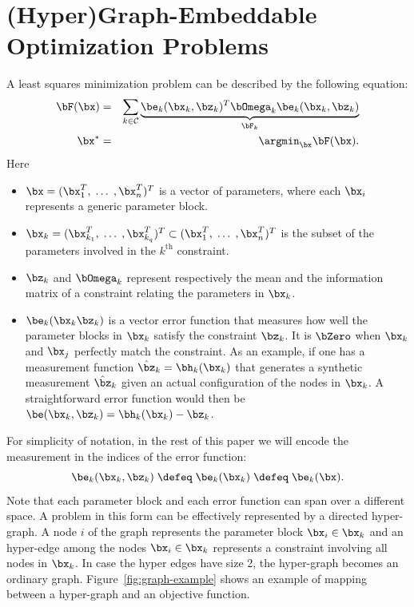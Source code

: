 \documentclass[a4paper]{article}
\begin{document}
\section{(Hyper)Graph-Embeddable Optimization Problems}
A least squares minimization problem can be described by the following equation:
\begin{eqnarray}
\bF(\bx)&=& \sum_{k \in\mathcal{C}}
\underbrace{\be_k(\bx_k, \bz_{k})^T \bOmega_{k} \be_k(\bx_k, \bz_{k})}_{\bF_{k}}
\label{eq:sumOfFactors}\\
\bx^*&=&\argmin_{\bx} \bF(\bx).
\label{eq:toMinimize}
\end{eqnarray}
Here
\begin{itemize}
  \item  $\bx=(\bx_1^T,\;\ldots\;,\bx_n^T)^T$ is a vector of
    parameters, where each $\bx_i$ represents a generic parameter block.
  \item $\bx_k=(\bx_{k_1}^T,\;\ldots\;,\bx_{k_q}^T)^T \subset
    (\bx_1^T,\;\ldots\;,\bx_n^T)^T$ is the subset of the parameters
    involved in the $k^\mathrm{th}$ constraint.
  \item $\bz_{k}$ and $\bOmega_{k}$ represent
    respectively the mean and the information matrix of a constraint
    relating the parameters in $\bx_k$.
  \item $\be_k(\bx_k \bz_{k})$ is a vector error function
    that measures how well the parameter blocks in $\bx_k$ satisfy the
    constraint $\bz_{k}$. It is $\bZero$ when $\bx_k$ and $\bx_j$
    perfectly match the constraint.  As an example, if one has a
    measurement function $\hat \bz_k = \bh_k(\bx_k)$ that generates a
    synthetic measurement $\hat \bz_k$ given an actual configuration
    of the nodes in $\bx_k$.  A straightforward error function would
    then be $\be(\bx_k, \bz_{k}) = \bh_k(\bx_k) - \bz_k$.
\end{itemize}
For simplicity of notation, in the rest of this paper we will encode
the measurement in the indices of the error function:
\begin{equation}
\be_k(\bx_k, \bz_{k}) \; \defeq \; \be_{k}(\bx_k) \; \defeq \; \be_{k}(\bx).
\end{equation}
Note that each parameter block and each error
function can span over a different space.  A problem in this form can
be effectively represented by a directed hyper-graph. A node $i$ of
the graph represents the parameter block $\bx_i \in \bx_k$ and an
hyper-edge among the nodes $\bx_{i} \in \bx_k $ represents a
constraint involving all nodes in $\bx_k$. In case the hyper edges
have size 2, the hyper-graph becomes an ordinary graph.
Figure~\ref{fig:graph-example} shows an
example of mapping between a hyper-graph and an objective function.
\end{document}
